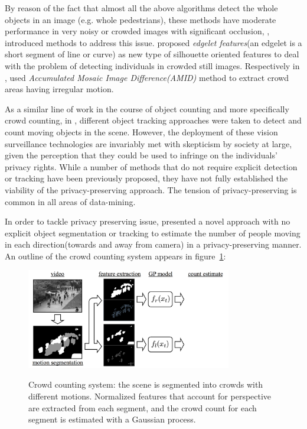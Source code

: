 By reason of the fact that almost all the above algorithms detect the whole objects in an image (e.g. whole pedestrians), these methods have moderate performance in very noisy or crowded images with significant occlusion, \citealt*{wu2005detection, lin2001estimation}, introduced methods to address this issue. \citealt*{wu2005detection} proposed \textit{edgelet features}(an edgelet is a short segment of line or curve) as new type of silhouette oriented features to deal with the problem of detecting individuals in crowded still images. Respectively in \cite{lin2001estimation}, \citeauthor*{lin2001estimation} used \textit{Accumulated Mosaic Image Difference(AMID)} method to extract crowd areas having irregular motion. 

\indent As a similar line of work in the course of object counting and more specifically crowd counting, in \cite{rabaud2006counting, brostow2006unsupervised, leibe2007coupled}, different object tracking approaches were taken to detect and count moving objects in the scene. However, the deployment of these vision surveillance technologies are invariably met with skepticism by society at large, given the perception that they could be used to infringe on the individuals' privacy rights. While a number of methods that do not require explicit detection or tracking have been previously proposed\cite{paragios2001mrf, cho1999neural, regazzoni1996distributed, davies1995crowd, kong2005counting, marana1998efficacy, dong2007fast}, they have not fully established the viability of the privacy-preserving approach\cite{chan2008privacy}. The tension of privacy-preserving is common in all areas of data-mining\cite{vaidya2006privacy, verykios2004state}. 

In order to tackle privacy preserving issue, \citealt*{chan2008privacy} presented a novel approach with no explicit object segmentation or tracking to estimate the number of people moving in each direction(towards and away from camera) in a privacy-preserving manner. An outline of the crowd counting system appears in figure~\ref{fig:ucsd}:
\begin{figure}[H]
	\centering
	{\includegraphics[width=0.8\textwidth]{images/ucsdOutline}}
	\caption{Crowd counting system: the scene is segmented into crowds with different motions. Normalized features that account for perspective are extracted from each segment, and the crowd count for each segment is estimated with a Gaussian process\cite{chan2008privacy}.}
	\label{fig:ucsd}
\end{figure}


